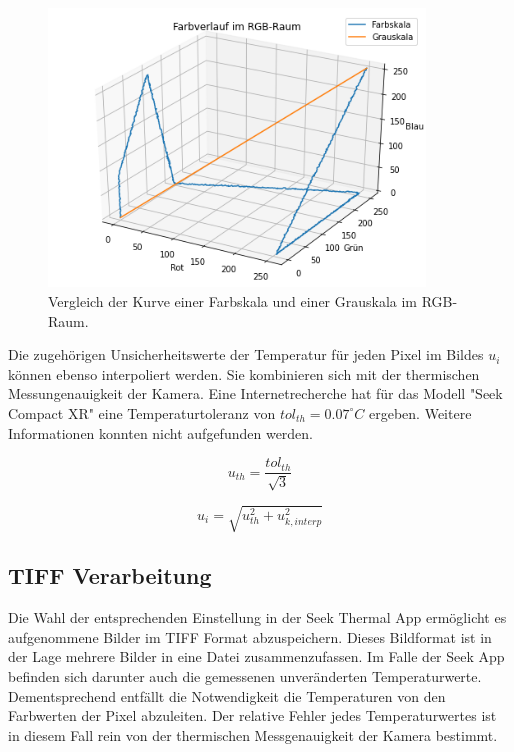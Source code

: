 \documentclass{article}
\begin{document}
\begin{figure}[H]
    \centering
    \captionsetup{width=8cm}
    \includegraphics[width=10cm]{img/farb_vs_grau.png}
    \caption{Vergleich der Kurve einer Farbskala und einer Grauskala im RGB-Raum.}
\end{figure}

Die zugehörigen Unsicherheitswerte der Temperatur für jeden Pixel im Bildes $u_i$ können ebenso interpoliert werden.
Sie kombinieren sich mit der thermischen Messungenauigkeit der Kamera.
Eine Internetrecherche hat für das Modell "Seek Compact XR" eine Temperaturtoleranz von $tol_{th} = 0.07 ^{\circ}C$ ergeben.
Weitere Informationen konnten nicht aufgefunden werden.

\begin{equation}
    u_{th} = \frac{tol_{th}}{\sqrt{3}}
\end{equation}

\begin{equation}
   u_i = \sqrt{ u_{th}^2 + u_{k,interp}^2 } 
\end{equation}

\subsection{TIFF Verarbeitung}
Die Wahl der entsprechenden Einstellung in der Seek Thermal App ermöglicht es aufgenommene Bilder im TIFF Format abzuspeichern. 
Dieses Bildformat ist in der Lage mehrere Bilder in eine Datei zusammenzufassen.
Im Falle der Seek App befinden sich darunter auch die gemessenen unveränderten Temperaturwerte.
Dementsprechend entfällt die Notwendigkeit die Temperaturen von den Farbwerten der Pixel abzuleiten.
Der relative Fehler jedes Temperaturwertes ist in diesem Fall rein von der thermischen Messgenauigkeit der Kamera bestimmt.
\end{document}
